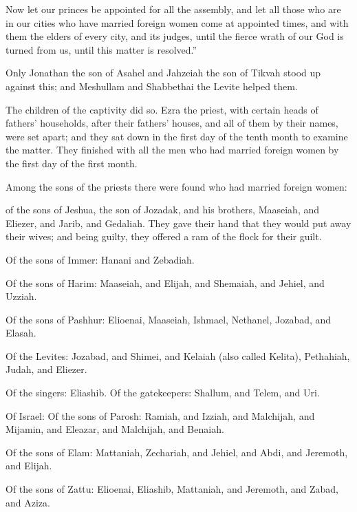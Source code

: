 {Now let our princes be appointed for all the assembly, and let all those who are in our cities who have married foreign women come at appointed times, and with them the elders of every city, and its judges, until the fierce wrath of our God is turned from us, until this matter is resolved.”
\par }{\PP {}Only Jonathan the son of Asahel and Jahzeiah the son of Tikvah stood up against this; and Meshullam and Shabbethai the Levite helped them.
\par }{\PP {}The children of the captivity did so. Ezra the priest, with certain heads of fathers’ households, after their fathers’ houses, and all of them by their names, were set apart; and they sat down in the first day of the tenth month to examine the matter.
They finished with all the men who had married foreign women by the first day of the first month.
\par }{\PP {}Among the sons of the priests there were found who had married foreign women:
\par }{\LI of the sons of Jeshua, the son of Jozadak, and his brothers, Maaseiah, and Eliezer, and Jarib, and Gedaliah.
They gave their hand that they would put away their wives; and being guilty, they offered a ram of the flock for their guilt.
\par }{\LI {}Of the sons of Immer: Hanani and Zebadiah.
\par }{\LI {}Of the sons of Harim: Maaseiah, and Elijah, and Shemaiah, and Jehiel, and Uzziah.
\par }{\LI {}Of the sons of Pashhur: Elioenai, Maaseiah, Ishmael, Nethanel, Jozabad, and Elasah.
\par }{\BB \par }{\LI {}Of the Levites: Jozabad, and Shimei, and Kelaiah (also called Kelita), Pethahiah, Judah, and Eliezer.
\par }{\BB \par }{\LI {}Of the singers: Eliashib. Of the gatekeepers: Shallum, and Telem, and Uri.
\par }{\BB \par }{\LI {}Of Israel: Of the sons of Parosh: Ramiah, and Izziah, and Malchijah, and Mijamin, and Eleazar, and Malchijah, and Benaiah.
\par }{\LI {}Of the sons of Elam: Mattaniah, Zechariah, and Jehiel, and Abdi, and Jeremoth, and Elijah.
\par }{\LI {}Of the sons of Zattu: Elioenai, Eliashib, Mattaniah, and Jeremoth, and Zabad, and Aziza.
}

